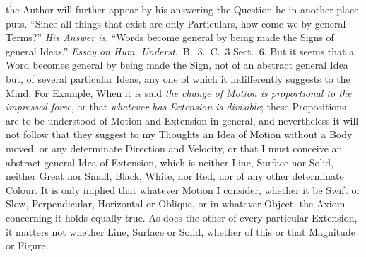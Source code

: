 \documentclass[]{article}
\newenvironment{sectionbody}{}{}
\begin{document}
\begin{sectionbody}
the Author will further appear by his answering the Question he
in another place puts.  ``Since all things that exist are only
Particulars, how come we by general Terms?''  \emph{His Answer
is}, ``Words become general by being made the Signs of
general Ideas.''
\emph{Essay on Hum. Underst}.\ B.~3.\ C.~3 Sect.~6.
But it seems that a Word becomes general by being made the Sign,
not of an abstract general Idea but, of several particular Ideas,
any one of which it indifferently suggests to the Mind.  For
Example, When it is said \emph{the change of Motion is proportional
to the impressed force}, or that \emph{whatever has Extension
is divisible}; these Propositions are to be understood of
Motion and Extension in general, and nevertheless it will not
follow that they suggest to my Thoughts an Idea of Motion without
a Body moved, or any determinate Direction and Velocity, or that
I must conceive an abstract general Idea of Extension, which is
neither Line, Surface nor Solid, neither Great nor Small, Black,
White, nor Red, nor of any other determinate Colour.  It is only
implied that whatever Motion I consider, whether it be Swift or
Slow, Perpendicular, Horizontal or Oblique, or in whatever
Object, the Axiom concerning it holds equally true.  As does the
other of every particular Extension, it matters not whether Line,
Surface or Solid, whether of this or that Magnitude or Figure.




\end{sectionbody}
\end{document}
